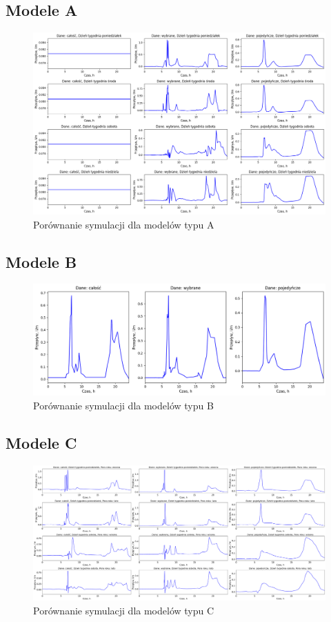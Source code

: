 \documentclass[a4paper,twoside,12pt]{book}
\begin{document}
\subsection*{Modele A}
\begin{figure}[!h]
  \centering
  \includegraphics[width=1\textwidth]{img/Model_A.png}
  \caption{Porównanie symulacji dla modelów typu A}
  \label{fig:etykieta-rysunku}
\end{figure}

\newpage
\subsection*{Modele B}
\begin{figure}[!h]
  \centering
  \includegraphics[width=1\textwidth]{img/Model_B.png}
  \caption{Porównanie symulacji dla modelów typu B}
  \label{fig:etykieta-rysunku}
\end{figure}

\newpage
\subsection*{Modele C}
\begin{figure}[!h]
  \centering
  \includegraphics[width=1\textwidth]{img/Model_C.png}
  \caption{Porównanie symulacji dla modelów typu C}
  \label{fig:etykieta-rysunku}
\end{figure}
\end{document}

